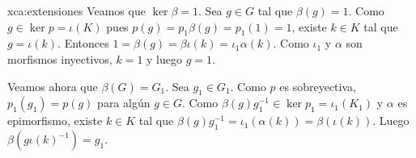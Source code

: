 \begin{sol}{xca:extensiones}
	Veamos que $\ker\beta=1$. Sea $g\in G$ tal que $\beta(g)=1$. Como $g\in\ker
	p=\iota(K)$ pues $p(g)=p_1\beta(g)=p_1(1)=1$, existe $k\in K$ tal que
	$g=\iota(k)$. Entonces $1=\beta(g)=\beta\iota(k)=\iota_1\alpha(k)$. Como
	$\iota_1$ y $\alpha$ son morfismos inyectivos, $k=1$ y luego $g=1$.
	
	Veamos ahora que $\beta(G)=G_1$. Sea $g_1\in G_1$. Como $p$ es
	sobreyectiva, $p_1(g_1)=p(g)$ para algún $g\in G$. Como
	$\beta(g)g_1^{-1}\in \ker p_1=\iota_1(K_1)$ y $\alpha$ es epimorfismo,
	existe $k\in K$ tal que
	$\beta(g)g_1^{-1}=\iota_1(\alpha(k))=\beta(\iota(k))$. Luego
	$\beta(g\iota(k)^{-1})=g_1$.
\end{sol}
